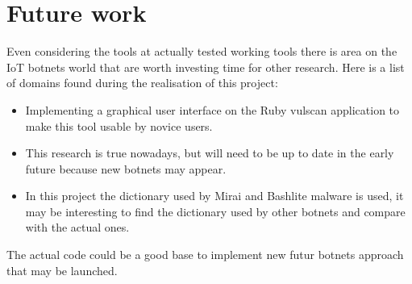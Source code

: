 \documentclass{report}
\begin{document}
\chapter{Future work}
Even considering the tools at actually tested working tools there is area on the IoT botnets world that are worth investing time for other research. Here is a list of domains found during the realisation of this project:
\begin{itemize}
 \item Implementing a graphical user interface on the Ruby vulscan application to make this tool usable by novice users.
 \item This research is true nowadays, but will need to be up to date in the early future because new botnets may appear.
 \item In this project the dictionary used by Mirai and Bashlite malware is used, it may be interesting to find the dictionary used by other botnets and compare with the actual ones.
\end{itemize}
The actual code could be a good base to implement new futur botnets approach that may be launched.

\printbibliography

\listoffigures
\end{document}
